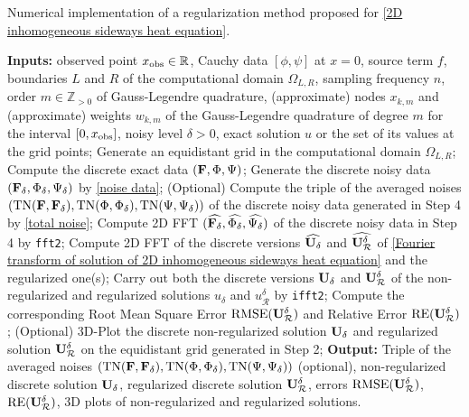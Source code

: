 \documentclass[oneside,11pt]{book}
\numberwithin{equation}{section}
\begin{document}
\begin{algorithm}[H]
    \caption{Numerical implementation of a regularization method proposed for \eqref{2D inhomogeneous sideways heat equation}.}
    \label{algorithm1}
    \begin{algorithmic}[1]
        \State \textbf{Inputs:} observed point $x_{\rm obs} \in\mathbb{R}$, Cauchy data $\left[\phi,\psi\right]$ at $x = 0$, source term $f$, boundaries $L$ and $R$ of the computational domain $\Omega _{L,R}$, sampling frequency $n$, order $m\in \mathbb{Z}_{> 0}$ of Gauss-Legendre quadrature, (approximate) nodes $x_{k,m}$ and (approximate) weights $w_{k,m}$ of the Gauss-Legendre quadrature of degree $m$ for the interval $[0,x_{\rm obs}]$, noisy level $\delta > 0$, exact solution $u$ or the set of its values at the grid points;
        \State Generate an equidistant grid in the computational domain $\Omega _{L,R}$; 
        \State Compute the discrete exact data $({\bf F},\Phi,\Psi)$;
        \State Generate the discrete noisy data $({\bf F}_\delta,\Phi_\delta,\Psi_\delta)$ by \eqref{noise data};
        \State (Optional) Compute the triple of the averaged noises $(\operatorname{TN}({\bf F},{\bf F}_\delta),\operatorname{TN}(\Phi,\Phi_\delta),\operatorname{TN}(\Psi,\Psi_\delta))$ of the discrete noisy data generated in Step 4 by \eqref{total noise}; 
        \State Compute 2D FFT $(\widehat{{\bf F}_\delta},\widehat{\Phi_\delta},\widehat{\Psi_\delta})$ of the discrete noisy data in Step 4 by \verb|fft2|;
        \State Compute 2D FFT of the discrete versions $\widehat{{\bf U}_\delta}$ and $\widehat{{\bf U}_\mathcal{R}^\delta}$ of \eqref{Fourier transform of solution of 2D inhomogeneous sideways heat equation} and the regularized one(s);
        \State Carry out both the discrete versions ${\bf U}_\delta$ and ${\bf U}_\mathcal{R}^\delta$ of the non-regularized and regularized solutions $u_\delta$ and $u_\mathcal{R}^\delta$ by \verb|ifft2|;
        \State Compute the corresponding Root Mean Square Error $\operatorname{RMSE}({\bf U}_\mathcal{R}^\delta)$ and Relative Error $\operatorname{RE}({\bf U}_\mathcal{R}^\delta)$;
        \State (Optional) 3D-Plot the discrete non-regularized solution ${\bf U}_\delta$ and regularized solution ${\bf U}_\mathcal{R}^\delta$ on the equidistant grid generated in Step 2;
        \State \textbf{Output:} Triple of the averaged noises $(\operatorname{TN}({\bf F},{\bf F}_\delta),\operatorname{TN}(\Phi,\Phi_\delta),\operatorname{TN}(\Psi,\Psi_\delta))$ (optional), non-regularized discrete solution ${\bf U}_\delta$, regularized discrete solution ${\bf U}_\mathcal{R}^\delta$, errors $\operatorname{RMSE}({\bf U}_\mathcal{R}^\delta)$, $\operatorname{RE}({\bf U}_\mathcal{R}^\delta)$, 3D plots of non-regularized and regularized solutions.
    \end{algorithmic}
\end{algorithm}
\end{document}
